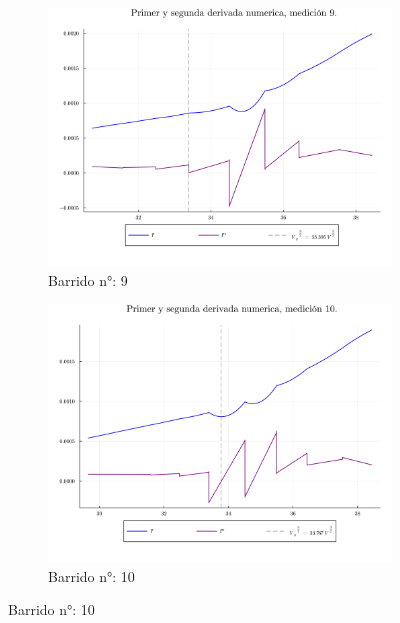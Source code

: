 \begin{figure}[H]
\ContinuedFloat %
\centering
\begin{subfigure}[b]{0.49\textwidth}
	\centering
	\includegraphics[width=\linewidth]{img/potderps9.png}
	\caption{Barrido n°: 9}
	\label{fig:potderps9}
\end{subfigure}
\hfill
\begin{subfigure}[b]{0.49\textwidth}
	\centering
	\includegraphics[width=\linewidth]{img/potderps10.png}
	\caption{Barrido n°: 10}
	\label{fig:potderps10}
\end{subfigure}


\end{figure}
